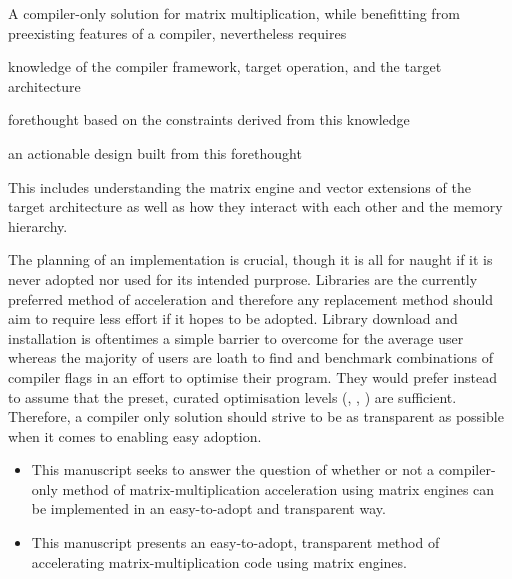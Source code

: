 \documentclass[\main/thesis.tex]{subfiles}
\begin{document}
A compiler-only solution for matrix multiplication, while benefitting from preexisting features of a compiler, nevertheless requires
\begin{enumerate*}[itemjoin={{; }}, itemjoin*={{; and }}, label={}, afterlabel={}, after={.}]
  \item knowledge of the compiler framework, target operation, and the target architecture
  \item forethought based on the constraints derived from this knowledge
  \item an actionable design built from this forethought
\end{enumerate*}
This includes understanding the matrix engine and vector extensions of the target architecture as well as how they interact with each other and the memory hierarchy.

The planning of an implementation is crucial, though it is all for naught if it is never adopted nor used for its intended purprose.
Libraries are the currently preferred method of acceleration and therefore any replacement method should aim to require less effort if it hopes to be adopted.
Library download and installation is oftentimes a simple barrier to overcome for the average user whereas the majority of users are loath to find and benchmark combinations of compiler flags in an effort to optimise their program.
They would prefer instead to assume that the preset, curated optimisation levels (\ie {}, , ) are sufficient.
Therefore, a compiler only solution should strive to be as transparent as possible when it comes to enabling easy adoption.

\begin{itemize}
  \item
    This manuscript seeks to answer the question of whether or not a compiler-only method of matrix-multiplication acceleration using matrix engines can be implemented in an easy-to-adopt and transparent way.
  \item
    This manuscript presents an easy-to-adopt, transparent method of accelerating matrix-multiplication code using matrix engines.
\end{itemize}
\end{document}
